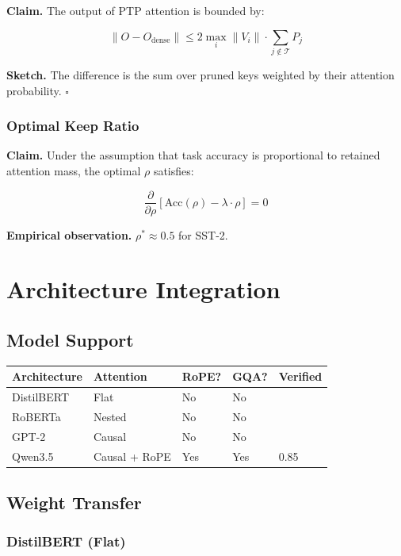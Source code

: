 \textbf{Claim.} The output of PTP attention is bounded by:

\[
\|O - O_\text{dense}\| \leq 2 \max_i \|V_i\| \cdot \sum_{j \notin \mathcal{T}} P_j
\tag{4.9}
\]

\textbf{Sketch.} The difference is the sum over pruned keys weighted by their 
attention probability. $\square$

\subsubsection{Optimal Keep Ratio}

\textbf{Claim.} Under the assumption that task accuracy is proportional to 
retained attention mass, the optimal $\rho$ satisfies:

\[
\frac{\partial}{\partial \rho} \left[\text{Acc}(\rho) - \lambda \cdot \rho\right] = 0
\tag{4.10}
\]

\textbf{Empirical observation.} $\rho^* \approx 0.5$ for SST-2.




\section{Architecture Integration}

\subsection{Model Support}

\begin{table}[H]
\centering
\small
\begin{tabular}{lllll}
\toprule
\textbf{Architecture} & \textbf{Attention} & \textbf{RoPE?} & \textbf{GQA?} & \textbf{Verified} \\
\midrule
DistilBERT & Flat & No & No &  \\
RoBERTa & Nested & No & No &  \\
GPT-2 & Causal & No & No &  \\
Qwen3.5 & Causal + RoPE & Yes & Yes & 0.85 \\
\bottomrule
\end{tabular}
\end{table}

\subsection{Weight Transfer}

\subsubsection{DistilBERT (Flat)}

